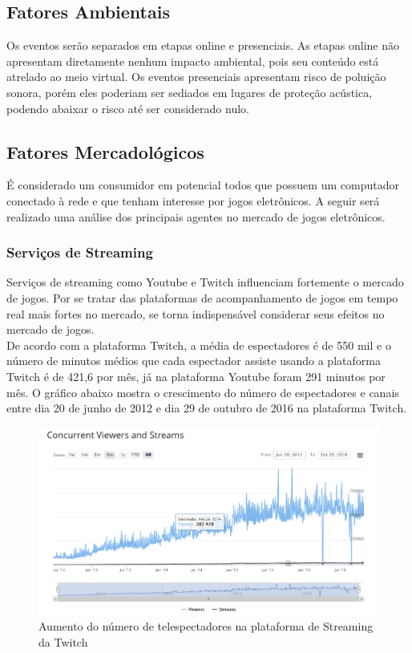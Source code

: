 \documentclass[a4paper, 12pt]{paper}
\begin{document}
\subsection{Fatores Ambientais}
Os eventos serão separados em etapas online e presenciais. As etapas online não apresentam diretamente nenhum impacto ambiental, pois seu conteúdo está atrelado ao meio virtual. Os eventos presenciais apresentam risco de poluição sonora, porém eles poderiam ser sediados em lugares de proteção acústica, podendo abaixar o risco até ser considerado nulo.
\subsection{Fatores Mercadológicos}
É considerado um consumidor em potencial todos que possuem um computador conectado à rede e que tenham interesse por jogos eletrônicos. A seguir será realizado uma análise dos principais agentes no mercado de jogos eletrônicos.
\subsubsection{Serviços de Streaming}
Serviços de streaming como Youtube e Twitch influenciam fortemente o mercado de jogos. Por se tratar das plataformas de acompanhamento de jogos em tempo real mais fortes no mercado, se torna indispensável considerar seus efeitos no mercado de jogos. \\
De acordo com a plataforma Twitch, a média de espectadores é de 550 mil e o número de minutos médios que cada espectador assiste usando a plataforma Twitch é de 421,6 por mês, já na plataforma Youtube foram 291 minutos por mês. O gráfico abaixo mostra o crescimento do número de espectadores e canais entre dia 20 de junho de 2012 e dia 29 de outubro de 2016 na plataforma Twitch.
\begin{figure}[!ht]
	\centering
	\includegraphics[scale=0.62]{img/img03.png}
	\caption{Aumento do número de telespectadores na plataforma de Streaming da Twitch}	
\end{figure}
\end{document}
